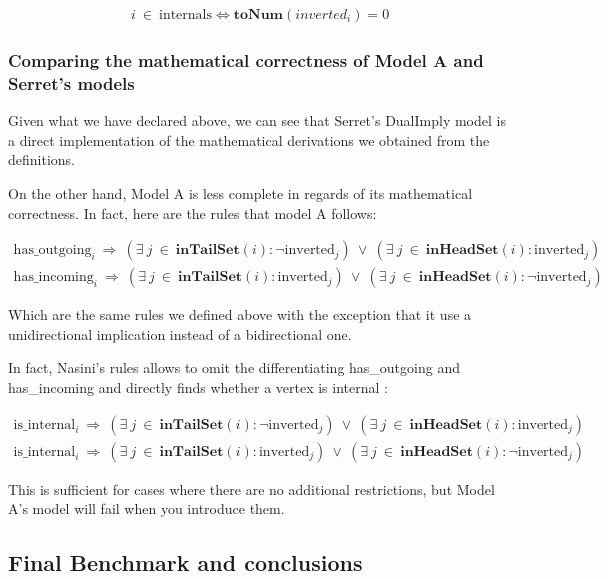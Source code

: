\begin{align}
    i~\in~\text{internals} \iff \textbf{toNum}(inverted_{i}) = 0
\end{align}

\subsubsection{Comparing the mathematical correctness of Model A and Serret's models}

Given what we have declared above, we can see that Serret's DualImply model is a direct implementation of the mathematical derivations we obtained from the definitions.

On the other hand, Model A is less complete in regards of its mathematical correctness.
In fact, here are the rules that model A follows:

\begin{align}
    \text{has\_outgoing}_{i}~\Longrightarrow~(\exists~j~\in~\textbf{inTailSet}(i): \lnot\text{inverted}_{j})~\vee~(\exists~j~\in~\textbf{inHeadSet}(i): \text{inverted}_{j}) \\
    \text{has\_incoming}_{i}~\Longrightarrow~(\exists~j~\in~\textbf{inTailSet}(i): \text{inverted}_{j})~\vee~(\exists~j~\in~\textbf{inHeadSet}(i): \lnot\text{inverted}_{j})
\end{align}

Which are the same rules we defined above with the exception that it use a unidirectional implication instead of a bidirectional one.

In fact, Nasini's rules allows to omit the differentiating has\_outgoing and has\_incoming and directly finds whether a vertex is internal :

\begin{align}
    \text{is\_internal}_{i}~\Longrightarrow~(\exists~j~\in~\textbf{inTailSet}(i): \lnot\text{inverted}_{j})~\vee~(\exists~j~\in~\textbf{inHeadSet}(i): \text{inverted}_{j}) \\
    \text{is\_internal}_{i}~\Longrightarrow~(\exists~j~\in~\textbf{inTailSet}(i): \text{inverted}_{j})~\vee~(\exists~j~\in~\textbf{inHeadSet}(i): \lnot\text{inverted}_{j})
\end{align}

This is sufficient for cases where there are no additional restrictions, but Model A's model will fail when you introduce them.

\subsection{Final Benchmark and conclusions} \label{sec:benchmark}

